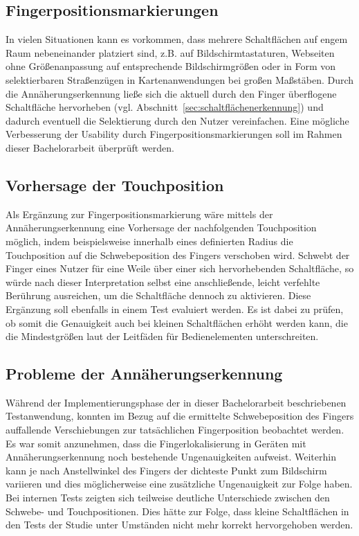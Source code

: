 \documentclass[12pt,numbers=noenddot,parskip,bibliography=totocnumbered,listof=totocnumbered]{scrreprt}
\begin{document}
\subsection{Fingerpositionsmarkierungen}
In vielen Situationen kann es vorkommen, dass mehrere Schaltflächen auf engem Raum nebeneinander platziert sind, z.B. auf Bildschirmtastaturen, Webseiten ohne Größenanpassung auf entsprechende Bildschirmgrößen oder in Form von selektierbaren Straßenzügen in Kartenanwendungen bei großen Maßstäben. Durch die Annäherungserkennung ließe sich die aktuell durch den Finger überflogene Schaltfläche hervorheben (vgl. Abschnitt~\ref{sec:schaltflächenerkennung}) und dadurch eventuell die Selektierung durch den Nutzer vereinfachen. Eine mögliche Verbesserung der Usability durch Fingerpositionsmarkierungen soll im Rahmen dieser Bachelorarbeit überprüft werden.

\subsection{Vorhersage der Touchposition}
Als Ergänzung zur Fingerpositionsmarkierung wäre mittels der Annäherungserkennung eine Vorhersage der nachfolgenden Touchposition möglich, indem beispielsweise innerhalb eines definierten Radius die Touchposition auf die Schwebeposition des Fingers verschoben wird. Schwebt der Finger eines Nutzer für eine Weile über einer sich hervorhebenden Schaltfläche, so würde nach dieser Interpretation selbst eine anschließende, leicht verfehlte Berührung ausreichen, um die Schaltfläche dennoch zu aktivieren. Diese Ergänzung soll ebenfalls in einem Test evaluiert werden. Es ist dabei zu prüfen, ob somit die Genauigkeit auch bei kleinen Schaltflächen erhöht werden kann, die die Mindestgrößen laut der Leitfäden für Bedienelementen unterschreiten.

\subsection{Probleme der Annäherungserkennung}\label{sec:kalibrierung}
Während der Implementierungsphase der in dieser Bachelorarbeit beschriebenen Testanwendung, konnten im Bezug auf die ermittelte Schwebeposition des Fingers auffallende Verschiebungen zur tatsächlichen Fingerposition beobachtet werden. Es war somit anzunehmen, dass die Fingerlokalisierung in Geräten mit Annäherungserkennung noch bestehende Ungenauigkeiten aufweist. Weiterhin kann je nach Anstellwinkel des Fingers der dichteste Punkt zum Bildschirm variieren und dies möglicherweise eine zusätzliche Ungenauigkeit zur Folge haben. Bei internen Tests zeigten sich teilweise deutliche Unterschiede zwischen den Schwebe- und Touchpositionen. Dies hätte zur Folge, dass kleine Schaltflächen in den Tests der Studie unter Umständen nicht mehr korrekt hervorgehoben werden.
\end{document}
